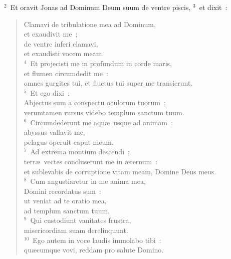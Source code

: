 ${}^{2}$~Et oravit Jonas ad Dominum Deum suum de ventre piscis,
${}^{3}$~et dixit~: \begin{flushleft}\begin{verse}Clamavi de tribulatione mea ad Dominum,\\ et exaudivit me~;\\ de ventre inferi clamavi,\\ et exaudisti vocem meam.\\
${}^{4}$~Et projecisti me in profundum in corde maris,\\ et flumen circumdedit me~:\\ omnes gurgites tui, et fluctus tui super me transierunt.\\
${}^{5}$~Et ego dixi~:\\ Abjectus sum a conspectu oculorum tuorum~;\\ verumtamen rursus videbo templum sanctum tuum.\\
${}^{6}$~Circumdederunt me aqu\ae\ usque ad animam~:\\ abyssus vallavit me,\\ pelagus operuit caput meum.\\
${}^{7}$~Ad extrema montium descendi~;\\ terr\ae\ vectes concluserunt me in \ae ternum~:\\ et sublevabis de corruptione vitam meam, Domine Deus meus.\\
${}^{8}$~Cum angustiaretur in me anima mea,\\ Domini recordatus sum~:\\ ut veniat ad te oratio mea,\\ ad templum sanctum tuum.\\
${}^{9}$~Qui custodiunt vanitates frustra,\\ misericordiam suam derelinquunt.\\
${}^{10}$~Ego autem in voce laudis immolabo tibi~:\\ qu\ae cumque vovi, reddam pro salute Domino.\end{verse}\end{flushleft}


